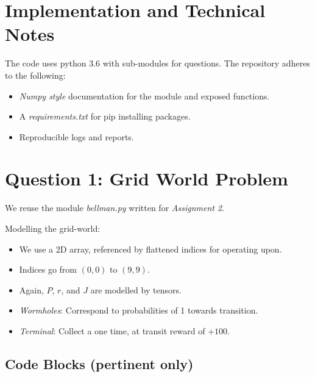 \section {Implementation and Technical Notes}

The code uses python 3.6 with sub-modules for questions. The repository adheres to the following:
\begin{itemize}
\item \textit{Numpy style} documentation for the module and exposed functions. 
\item A \textit{requirements.txt }for pip installing packages.
\item  Reproducible logs and reports.
\end{itemize}

\section{Question 1: Grid World Problem}

We reuse the module \textit{bellman.py} written for \textit{Assignment 2}.

Modelling the grid-world:
\begin{itemize}
\item We use a 2D array, referenced by flattened indices for operating upon.
\item Indices go from $(0,0)$ to $(9,9)$. 
\item Again, $P$, $r$, and $J$ are modelled by tensors.
\item \textit{Wormholes}: Correspond to probabilities of 1 towards transition.
\item \textit{Terminal}: Collect a one time, at transit reward of $+100$. 
\end{itemize}

\subsection{Code Blocks (pertinent only)}

